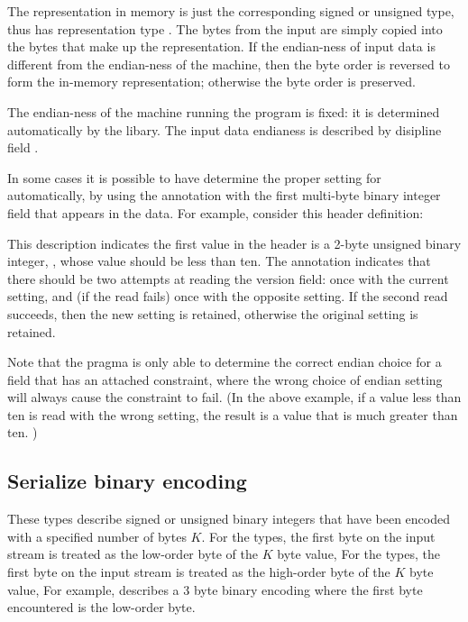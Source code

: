 The representation in memory is just the corresponding signed or
unsigned type, thus  has representation type .  The bytes from
the input are simply copied into the bytes that make up the representation.  If
the endian-ness of input data is different from the endian-ness of the
machine, then the byte order is reversed to form the in-memory
representation; otherwise the byte order is preserved.

The endian-ness of the machine running the \pads{} program is fixed: it
is determined automatically by the \pads{} libary.  
The input data endianess is described by \pads{} disipline 
field . 

In some cases it is possible to have \pads{} determine the
proper setting for  automatically, by
using the annotation 
with the first multi-byte binary integer field that appears
in the data.  For example, consider this header definition:

%
\noindent
This \padsl{} description indicates the first value in the header
is a 2-byte unsigned binary integer, ,
whose value should be less than ten.   The  annotation indicates that there
should be two attempts at reading the version field: once with the
current  setting, and (if the read fails) once with the
opposite  setting.  If the second read succeeds, then
the new  setting is retained, otherwise the original
setting is retained.

Note that the  pragma is only able to determine the correct endian
choice for a field that has an attached constraint, where the
wrong choice of endian setting will always cause the constraint to fail.
(In the above example, if a value less than ten is read with the wrong 
setting, the result is a value that is much greater than ten. )

\subsection{Serialize binary encoding}

\sbBegin{}
\bEnd{}

These types describe signed or unsigned binary integers
that have been encoded with a specified number of bytes $K$.
For the  types, the first byte on the input
stream is treated as the low-order byte of the $K$ byte value,
For the  types, the first byte on the input
stream is treated as the high-order byte of the $K$ byte value,
For example,  describes a 3 byte
binary encoding where the first byte encountered is the
low-order byte.


